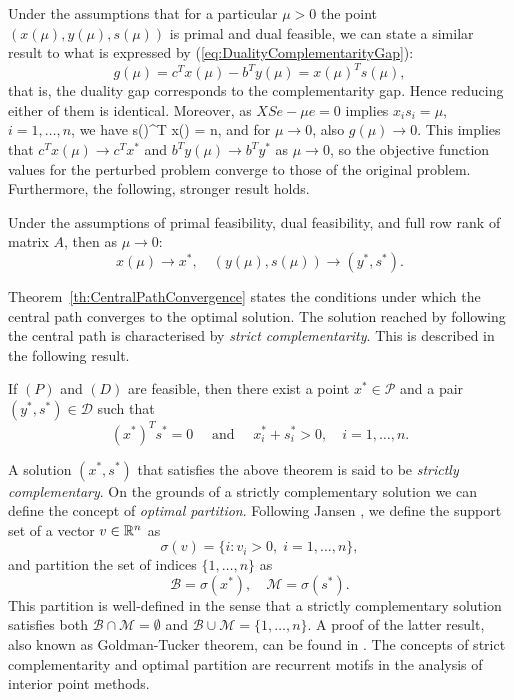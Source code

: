 
Under the assumptions that for a particular $\mu > 0$ the point
$(x(\mu),y(\mu),s(\mu))$ is primal and dual feasible, we can state
a similar result to what is expressed by 
(\ref{eq:DualityComplementarityGap}):
\[
  g(\mu) = c^Tx(\mu) - b^T y(\mu) = x(\mu)^T s(\mu),
\]
that is, the duality gap corresponds to the complementarity gap.
Hence reducing either of them is identical.
Moreover, as $XSe - \mu e = 0$ implies $x_is_i = \mu$, $i = 1, \ldots, n$, 
we have
\be  \label{eq:AverageComplementarity}
   s(\mu)^T x(\mu) = n\mu,
\ee
and for $\mu \to 0$, also $g(\mu) \to 0$.
This implies that $c^Tx(\mu)\to c^Tx^*$ and $b^Ty(\mu) \to b^Ty^*$ 
as $\mu\to 0$, so the objective function values for the perturbed
problem converge to those of the original problem.
Furthermore, the following, stronger result holds.
%
\begin{theorem}
\label{th:CentralPathConvergence}
Under the assumptions of primal feasibility, dual feasibility, and
full row rank of matrix $A$, then as $\mu \to 0$:
\[
   x(\mu) \to x^*, \quad (y(\mu),s(\mu)) \to (y^*, s^*).
\]
\end{theorem}

Theorem~\ref{th:CentralPathConvergence} states the conditions
under which the central path converges to the optimal solution.
The solution reached by following the central path is 
characterised by {\em strict complementarity}. 
This is described in the following result.

\begin{theorem}
If $(P)$ and $(D)$ are feasible, then there exist a point $x^* \in\mathcal{P}$
and a pair $(y^*,s^*) \in \mathcal{D}$ such that
\[
(x^*)^T s^* = 0 \quad\mbox{ and }\quad x^*_i + s_i^* >0, \quad i = 1,\ldots,n.
\]
\end{theorem}

A solution $(x^*,s^*)$ that satisfies the above theorem is said to be
{\em strictly complementary}. 
On the grounds of a strictly complementary
solution we can define the concept of {\em optimal partition}.
Following Jansen \cite{phd:Jansen}, we define the support set
of a vector $v \in \mathbb{R}^n$ as
\[
   \sigma(v) = \{ i : v_i > 0, \; i=1,\ldots,n \},
\]
and partition the set of indices $\{1,\ldots,n \}$ as
\[
   \mathcal{B} = \sigma(x^*), \quad \mathcal{M} = \sigma(s^*).
\]
This partition is well-defined in the sense that a 
strictly complementary solution satisfies both 
$\mathcal{B} \cap \mathcal{M} = \emptyset$ and 
$\mathcal{B} \cup \mathcal{M} = \{1,\ldots,n \}$. 
A proof of the latter result, also known as Goldman-Tucker theorem, 
can be found in \cite{ipm:Wright97}.
The concepts of strict complementarity and optimal partition are
recurrent motifs in the analysis of interior point methods.

